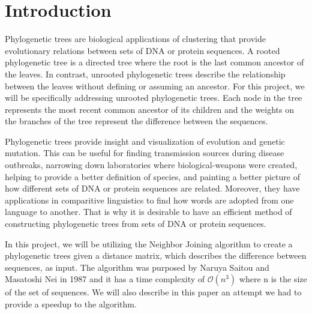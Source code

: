 \section{Introduction}

Phylogenetic trees are biological applications of clustering that provide evolutionary relations between sets of DNA or protein sequences. A rooted phylogenetic tree is a directed tree where the root is the last common ancestor of the leaves. In contrast, unrooted phylogenetic trees describe the relationship between the leaves without defining or assuming an ancestor. For this project, we will be specifically addressing unrooted phylogenetic trees. Each node in the tree represents the most recent common ancestor of its children and the weights on the branches of the tree represent the difference between the sequences.

Phylogenetic trees provide insight and visualization of evolution and genetic mutation. This can be useful for finding transmission sources during disease outbreaks, narrowing down laboratories where biological-weapons were created, helping to provide a better definition of species, and painting a better picture of how different sets of DNA or protein sequences are related. Moreover, they have applications in comparitive linguistics to find how words are adopted from one language to another. That is why it is desirable to have an efficient method of constructing phylogenetic trees from sets of DNA or protein sequences.

In this project, we will be utilizing the Neighbor Joining algorithm to create a phylogenetic trees given a distance matrix, which describes the difference between sequences, as input. The algorithm was purposed by Naruya Saitou and Masatoshi Nei in 1987 \cite{saitou1987neighbor} and it has a time complexity of $\mathcal{O}(n^3)$ where n is the size of the set of sequences. We will also describe in this paper an attempt we had to provide a speedup to the algorithm.
